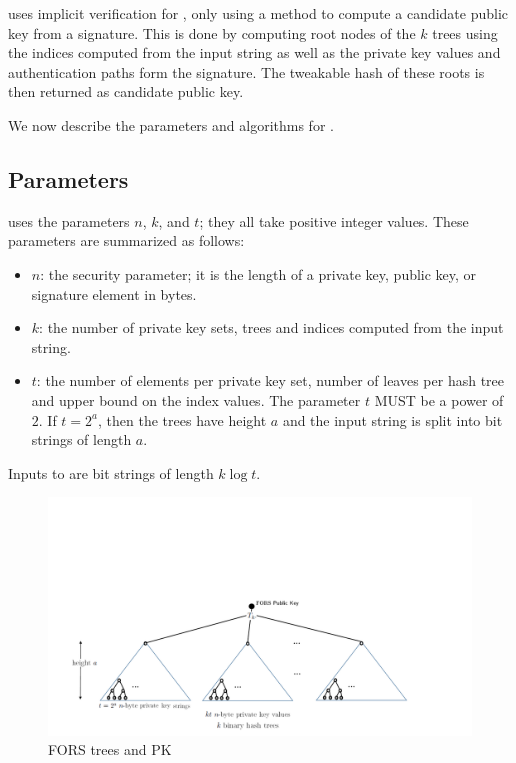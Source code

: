 \spx uses implicit verification for \fors, only using a method to compute
a candidate public key from a signature. This is done by computing root nodes 
of the $k$ trees using the indices computed from the input string as well as 
the private key values and authentication paths form the signature. The 
tweakable hash of these roots is then returned as candidate public key.

%
We now describe the parameters and algorithms for \fors.

\subsection{\fors Parameters}\label{sec:fors:params}
\fors uses the parameters $n$, $k$, and $t$; they all take positive integer 
values.
These parameters are summarized as follows:
\begin{itemize}
  \item $n$: the security parameter; it is the length of a private key, public 
  key, or signature element in bytes. 
  \item $k$: the number of private key sets, trees and indices computed 
  from the input string.
  \item $t$: the number of elements per private key set, number of leaves per 
  hash tree and upper bound on the index values. The parameter $t$ MUST 
  be a power of $2$. If $t = 2^a$, then the trees have height $a$ and the 
  input string is split into bit strings of length $a$.
\end{itemize}
Inputs to \fors are bit strings of length $k\log t$.

\begin{figure}[htb]
\includegraphics[width=7in,trim={0.5cm 0.5cm 0.5cm 7cm}, clip]{pics/fors_tree.pdf}
\caption{FORS trees and PK}
\end{figure}

